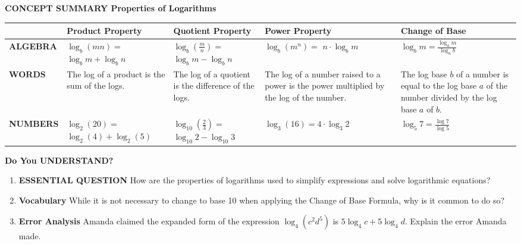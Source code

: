 \documentclass{article}
\newenvironment{concept-summary}{}{}
\begin{document}
\begin{concept-summary}
\textbf{CONCEPT SUMMARY Properties of Logarithms}

\begin{center}
\renewcommand{\arraystretch}{1.5}
\begin{tabular}{lp{3cm}p{3cm}p{3cm}p{3cm}}
\toprule
& \textbf{Product Property} & \textbf{Quotient Property} & \textbf{Power Property} & \textbf{Change of Base} \\
\midrule
\textbf{ALGEBRA} & $\log_b(mn) =$ \newline $\log_b m + \log_b n$ & $\log_b\left(\frac{m}{n}\right) =$ \newline $\log_b m - \log_b n$ & $\log_b(m^n) =$ \newline $n \cdot \log_b m$ & $\log_b m = \frac{\log_a m}{\log_a b}$ \\
\midrule
\textbf{WORDS} & The log of a product is the sum of the logs. & The log of a quotient is the difference of the logs. & The log of a number raised to a power is the power multiplied by the log of the number. & The log base $b$ of a number is equal to the log base $a$ of the number divided by the log base $a$ of $b$. \\
\midrule
\textbf{NUMBERS} & $\log_2(20) =$ \newline $\log_2(4) + \log_2(5)$ & $\log_{10}\left(\frac{2}{3}\right) =$ \newline $\log_{10} 2 - \log_{10} 3$ & $\log_3(16) = 4 \cdot \log_3 2$ & $\log_5 7 = \frac{\log 7}{\log 5}$ \\
\bottomrule
\end{tabular}
\end{center}
\end{concept-summary}

\vspace{1em}
\textbf{Do You UNDERSTAND?}
\begin{enumerate}
    \item \textbf{ESSENTIAL QUESTION} How are the properties of logarithms used to simplify expressions and solve logarithmic equations?
    \item \textbf{Vocabulary} While it is not necessary to change to base 10 when applying the Change of Base Formula, why is it common to do so?
    \item \textbf{Error Analysis} Amanda claimed the expanded form of the expression $\log_4(c^2 d^5)$ is $5\log_4 c + 5\log_4 d$. Explain the error Amanda made.
\end{enumerate}
\end{document}
